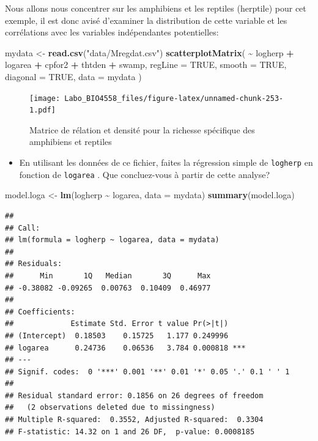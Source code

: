 \documentclass[
  12pt,
]{book}
\newenvironment{Shaded}{\begin{snugshade}}{\end{snugshade}}
\newcommand{\DataTypeTok}[1]{\textcolor[rgb]{0.13,0.29,0.53}{#1}}
\newcommand{\KeywordTok}[1]{\textcolor[rgb]{0.13,0.29,0.53}{\textbf{#1}}}
\newcommand{\NormalTok}[1]{#1}
\newcommand{\OperatorTok}[1]{\textcolor[rgb]{0.81,0.36,0.00}{\textbf{#1}}}
\newcommand{\OtherTok}[1]{\textcolor[rgb]{0.56,0.35,0.01}{#1}}
\newcommand{\StringTok}[1]{\textcolor[rgb]{0.31,0.60,0.02}{#1}}
\providecommand{\tightlist}{%
  \setlength{\itemsep}{0pt}\setlength{\parskip}{0pt}}
\begin{document}
Nous allons nous concentrer sur les amphibiens et les reptiles (herptile) pour cet exemple, il est donc avisé d'examiner la distribution de cette variable et les corrélations avec les variables indépendantes potentielles:

\begin{Shaded}
\begin{Highlighting}[]
\NormalTok{mydata \textless{}{-}}\StringTok{ }\KeywordTok{read.csv}\NormalTok{(}\StringTok{"data/Mregdat.csv"}\NormalTok{)}
\KeywordTok{scatterplotMatrix}\NormalTok{(}
  \OperatorTok{\textasciitilde{}}\StringTok{ }\NormalTok{logherp }\OperatorTok{+}\StringTok{ }\NormalTok{logarea }\OperatorTok{+}\StringTok{ }\NormalTok{cpfor2 }\OperatorTok{+}\StringTok{ }\NormalTok{thtden }\OperatorTok{+}\StringTok{ }\NormalTok{swamp,}
  \DataTypeTok{regLine =} \OtherTok{TRUE}\NormalTok{, }\DataTypeTok{smooth =} \OtherTok{TRUE}\NormalTok{, }\DataTypeTok{diagonal =} \OtherTok{TRUE}\NormalTok{,}
  \DataTypeTok{data =}\NormalTok{ mydata}
\NormalTok{)}
\end{Highlighting}
\end{Shaded}

\begin{figure}
\centering
\texttt{[image: Labo\_BIO4558\_files/figure-latex/unnamed-chunk-253-1.pdf]}
\caption{\label{fig:unnamed-chunk-253}Matrice de rélation et densité pour la richesse spécifique des amphibiens et reptiles}
\end{figure}

\begin{itemize}
\tightlist
\item
  En utilisant les données de ce fichier, faites la régression simple de \texttt{logherp} en fonction de \texttt{logarea} . Que concluez-vous à partir de cette analyse?
\end{itemize}

\begin{Shaded}
\begin{Highlighting}[]
\NormalTok{model.loga \textless{}{-}}\StringTok{ }\KeywordTok{lm}\NormalTok{(logherp }\OperatorTok{\textasciitilde{}}\StringTok{ }\NormalTok{logarea, }\DataTypeTok{data =}\NormalTok{ mydata)}
\KeywordTok{summary}\NormalTok{(model.loga)}
\end{Highlighting}
\end{Shaded}

\begin{verbatim}
## 
## Call:
## lm(formula = logherp ~ logarea, data = mydata)
## 
## Residuals:
##      Min       1Q   Median       3Q      Max 
## -0.38082 -0.09265  0.00763  0.10409  0.46977 
## 
## Coefficients:
##             Estimate Std. Error t value Pr(>|t|)    
## (Intercept)  0.18503    0.15725   1.177 0.249996    
## logarea      0.24736    0.06536   3.784 0.000818 ***
## ---
## Signif. codes:  0 '***' 0.001 '**' 0.01 '*' 0.05 '.' 0.1 ' ' 1
## 
## Residual standard error: 0.1856 on 26 degrees of freedom
##   (2 observations deleted due to missingness)
## Multiple R-squared:  0.3552, Adjusted R-squared:  0.3304 
## F-statistic: 14.32 on 1 and 26 DF,  p-value: 0.0008185
\end{verbatim}
\end{document}

